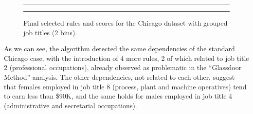 \begin{itemize}
\begin{figure}[t!]
\centering
\noindent\rule{\linewidth}{0.4pt}\par
\noindent\rule{\linewidth}{0.4pt}
\caption{Final selected rules and scores for the Chicago dataset with grouped job titles (2 bins).}
\label{fig:chicago_grouped_fair-db}
\end{figure}

As we can see, the algorithm detected the same dependencies of the standard Chicago case, with the introduction of 4 more rules, 2 of which related to job title 2 (professional occupations), already observed as problematic in the ``Glassdoor Method'' analysis. The other dependencies, not related to each other, suggest that females employed in job title 8 (process, plant and machine operatives) tend to earn less than \$90K, and the same holds for males employed in job title 4 (administrative and secretarial occupations).


\end{itemize}
